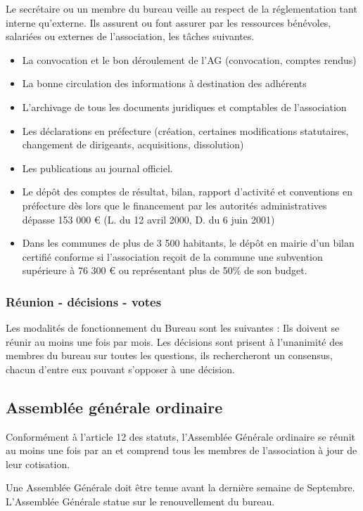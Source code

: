 \documentclass[a4paper,french,10pt]{article}
\begin{document}
Le secrétaire ou un membre du bureau veille au respect de la réglementation tant interne
qu’externe. Ils assurent ou font assurer par les ressources bénévoles,
salariées ou externes de l’association, les tâches suivantes.
\begin{itemize}
\item La convocation et le bon déroulement de l’AG (convocation, comptes rendus)
\item La bonne circulation des informations à destination des
  adhérents
\item L’archivage de tous les documents juridiques et comptables de
  l’association
\item Les déclarations en préfecture (création, certaines
  modifications statutaires, changement de dirigeants, acquisitions,
  dissolution)
\item Les publications au journal officiel.
\item Le dépôt des comptes de résultat, bilan, rapport d’activité et
  conventions en préfecture dès lors que le financement par les
  autorités administratives dépasse 153 000 \euro{} (L. du 12 avril 2000,
  D. du 6 juin 2001)
\item Dans les communes de plus de 3 500 habitants, le dépôt en mairie
  d’un bilan certifié conforme si l’association reçoit de la commune
  une subvention supérieure à 76 300 \euro{} ou représentant plus de 50\% de son budget.
\end{itemize}

\subsubsection{Réunion - décisions - votes}
\label{sec:reun-decis-votes}

Les modalités de fonctionnement du Bureau sont les suivantes : Ils
doivent se réunir au moins une fois par mois. Les décisions sont
prisent à l'unanimité des membres du bureau sur toutes les questions,
ils rechercheront un consensus, chacun d’entre eux pouvant s’opposer à
une décision.

\subsection{Assemblée générale ordinaire}
Conformément à l'article 12 des statuts, l’Assemblée Générale ordinaire se réunit au moins une fois par an et comprend tous les membres de l’association à jour de leur cotisation.

Une Assemblée Générale doit être tenue avant la dernière semaine de Septembre. L'Assemblée Générale statue sur le renouvellement du bureau.
\end{document}
